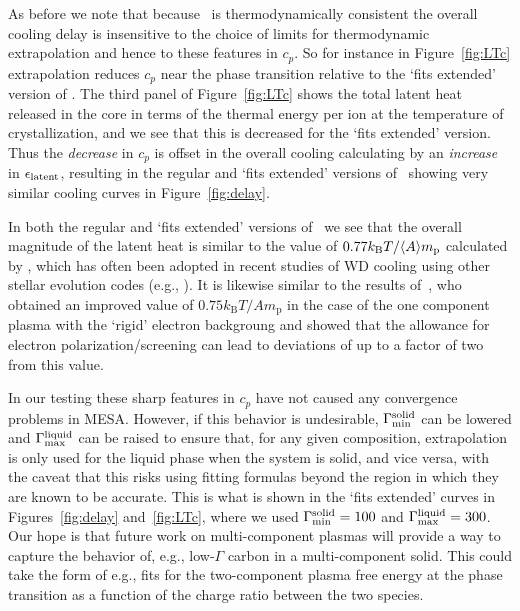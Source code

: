As before we note that because \skye\ is thermodynamically consistent the overall cooling delay is insensitive to the choice of limits for thermodynamic extrapolation and hence to these features in $c_p$.
So for instance in Figure~\ref{fig:LTc} extrapolation reduces $c_p$ near the phase transition relative to the `fits extended' version of \skye.
The third panel of Figure~\ref{fig:LTc} shows the total latent heat released in the core in terms of the thermal energy per ion at the temperature of crystallization, and we see that this is decreased for the `fits extended' version.
Thus the \emph{decrease} in $c_p$ is offset in the overall cooling calculating by an \emph{increase} in $\epsilon_{\rm latent}$, resulting in the regular and `fits extended' versions of \skye\ showing very similar cooling curves in Figure~\ref{fig:delay}.

In both the regular and `fits extended' versions of \skye\ we see that the overall magnitude of the latent heat is similar to the value of
$0.77 k_{\rm B}T/\langle A \rangle m_{\rm p}$ calculated by
\cite{Salaris2000}, which has often been adopted in recent studies of
WD cooling using other stellar evolution codes (e.g.,
\citealt{Camisassa2019}).
It is likewise similar to the results of~\citet{2013A&A...550A..43P}, who obtained an improved value of $0.75 k_\mathrm{B} T / A m_\mathrm{p}$ in the case of the one component plasma with the `rigid' electron backgroung and showed that the allowance for electron polarization/screening can lead to deviations of up to a factor of two from this value.

In our testing these sharp features in $c_p$ have not caused any convergence problems in MESA.
However, if this behavior is undesirable, $\Gamma_{\rm min}^{\rm solid}$ can be lowered and $\Gamma_{\rm max}^{\rm liquid}$ can be raised to ensure that, for any given composition, extrapolation is only used for the liquid phase when the system is solid, and vice versa, with the caveat that this risks using fitting formulas beyond the region in which they are known to be accurate.
This is what is shown in the `fits extended' curves in Figures~\ref{fig:delay} and~\ref{fig:LTc}, where we used $\Gamma_{\rm min}^{\rm solid}=100$ and $\Gamma_{\rm max}^{\rm liquid} = 300$.
Our hope is that future work on multi-component plasmas will provide a way to capture the behavior of, e.g., low-$\Gamma$ carbon in a multi-component solid.
This could take the form of e.g., fits for the two-component plasma free energy at the phase transition as a function of the charge ratio between the two species.

